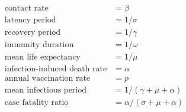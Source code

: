 \begin{align*}

\textrm{contact rate} &= \beta

\\

\textrm{latency period} &= 1/\sigma

\\

\textrm{recovery period} &= 1/\gamma

\\

\textrm{immunity duration} &= 1/\omega

\\

\textrm{mean life expectancy} &= 1/\mu

\\

\textrm{infection-induced death rate} &= \alpha

\\

\textrm{annual vaccination rate} &= p

\\

\textrm{mean infectious period} &= 1/(\gamma + \mu + \alpha)

\\

\textrm{case fatality ratio} &= \alpha / (\sigma + \mu + \alpha)

\end{align*}